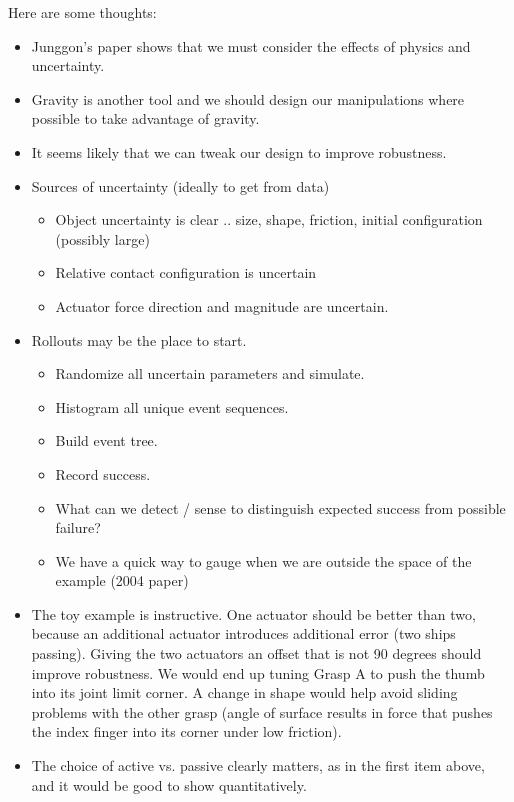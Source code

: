 Here are some thoughts:
\begin{itemize}
  \item Junggon's paper shows that we must consider the effects of physics and uncertainty. 
  \item Gravity is another tool and we should design our manipulations where possible to take advantage of gravity.
  \item It seems likely that we can tweak our design to improve robustness.
  \item Sources of uncertainty (ideally to get from data)
	\begin{itemize}
	   \item Object uncertainty is clear .. size, shape, friction, initial configuration (possibly large)
	   \item Relative contact configuration is uncertain
	   \item Actuator force direction and magnitude are uncertain.
	\end{itemize}
  \item Rollouts may be the place to start.
  	\begin{itemize}
	   \item  Randomize all uncertain parameters and simulate.
	   \item  Histogram all unique event sequences.
	   \item Build event tree.
	   \item Record success.
	   \item What can we detect / sense to distinguish expected success from possible failure?
	   \item We have a quick way to gauge when we are outside the space of the example (2004 paper)
	\end{itemize}
  \item  The toy example is instructive.   One actuator should be better than two, because an additional actuator introduces additional error (two ships passing).    Giving the two actuators an offset that is not 90 degrees should improve robustness.  We would end up tuning Grasp A to push the thumb into its joint limit corner.   A change in shape would help avoid sliding problems with the other grasp (angle of surface results in force that pushes the index finger into its corner under low friction).
  \item The choice of active vs. passive clearly matters, as in the first item above, and it would be good to show quantitatively.
\end{itemize}	
	
